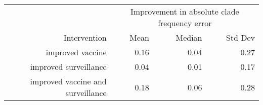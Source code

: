
\begin{tabular*}{0.7\textwidth}{rrrr}
\toprule
             & \multicolumn{3}{c}{Improvement in absolute clade frequency error} \\
Intervention & Mean & Median & Std Dev \\
\midrule

improved vaccine & 0.16 & 0.04 & 0.27 \\
improved surveillance & 0.04 & 0.01 & 0.17 \\
improved vaccine and surveillance & 0.18 & 0.06 & 0.28 \\

\bottomrule
\end{tabular*}

